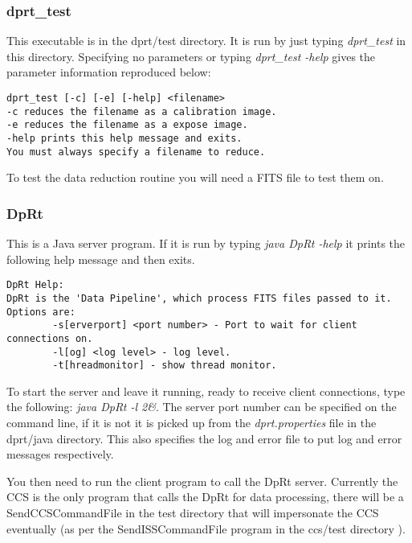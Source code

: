 \documentclass[10pt,a4paper]{article}
\begin{document}
\subsubsection{dprt\_test}
This executable is in the dprt/test directory. It is run by just typing {\em dprt\_test} in this directory.
Specifying no parameters or typing {\em dprt\_test -help} gives the parameter information reproduced below:
\begin{verbatim}
dprt_test [-c] [-e] [-help] <filename>
-c reduces the filename as a calibration image.
-e reduces the filename as a expose image.
-help prints this help message and exits.
You must always specify a filename to reduce.
\end{verbatim}
To test the data reduction routine you will need a FITS file to test them on.

\subsubsection{DpRt}
This is a Java server program. If it is run by typing {\em java DpRt -help} it prints the following help message
and then exits.
\begin{verbatim}
DpRt Help:
DpRt is the 'Data Pipeline', which process FITS files passed to it.
Options are:
        -s[erverport] <port number> - Port to wait for client connections on.
        -l[og] <log level> - log level.
        -t[hreadmonitor] - show thread monitor.
\end{verbatim}

To start the server and leave it running, ready to receive client connections, type the following:
{\em java DpRt -l 2\&}. The server port number can be specified on the command line, if it is not it is
picked up from the {\em dprt.properties} file in the dprt/java directory. This also specifies the log and
error file to put log and error messages respectively.

You then need to run the client program to call the DpRt server. Currently the CCS is the only program that
calls the DpRt for data processing, there will be a SendCCSCommandFile in the test directory that will
impersonate the CCS eventually (as per the SendISSCommandFile program in the ccs/test directory \cite{bib:ccs}).
\end{document}
